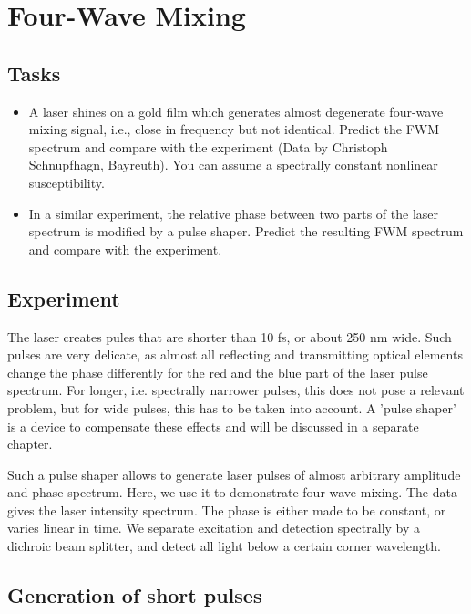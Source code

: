 \renewcommand{\lastmod}{May 22, 2020}
\chapter{Four-Wave Mixing}


\section{Tasks}

\begin{itemize}
\item A laser shines on a gold film which generates almost degenerate four-wave mixing signal, i.e., close in frequency but not identical. Predict the FWM spectrum and compare with the experiment (Data by Christoph Schnupfhagn, Bayreuth). You can assume a spectrally constant nonlinear  susceptibility.

\item In a similar experiment, the relative phase between two parts of the laser spectrum is modified by a pulse shaper. Predict the resulting FWM spectrum and compare with the experiment.
\end{itemize}

\section{Experiment}

The laser creates pules that are shorter than 10 fs, or about 250 nm wide. Such pulses are very delicate, as almost all reflecting and transmitting optical elements change the phase differently for the red and the blue part of the laser pulse spectrum. For longer, i.e. spectrally narrower pulses, this does not pose a relevant problem, but for wide pulses, this has to be taken into account. A 'pulse shaper' is a device to compensate these effects and will be discussed in a separate chapter.

Such a pulse shaper allows to generate laser pulses of almost arbitrary amplitude and phase spectrum. Here, we use it to demonstrate four-wave mixing. The data gives the laser intensity spectrum. The phase is either made to be constant, or varies linear  in time.
We separate excitation and detection spectrally by a dichroic beam splitter, and detect all light below a certain corner wavelength. 

\section{Generation of short pulses}


